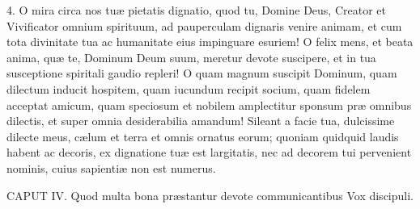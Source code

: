 4. O mira circa nos tuæ pietatis dignatio, quod tu, Domine Deus, Creator et Vivificator omnium spirituum, ad pauperculam dignaris venire animam, et cum tota divinitate tua ac humanitate eius impinguare esuriem! O felix mens, et beata anima, quæ te, Dominum Deum suum, meretur devote suscipere, et in tua susceptione spiritali gaudio repleri! O quam magnum suscipit Dominum, quam dilectum inducit hospitem, quam iucundum recipit socium, quam fidelem acceptat amicum, quam speciosum et nobilem amplectitur sponsum præ omnibus dilectis, et super omnia desiderabilia amandum! Sileant a facie tua, dulcissime dilecte meus, cælum et terra et omnis ornatus eorum; quoniam quidquid laudis habent ac decoris, ex dignatione tuæ est largitatis, nec ad decorem tui pervenient nominis, cuius sapientiæ non est numerus.


CAPUT IV.
Quod multa bona præstantur devote communicantibus
Vox discipuli.

